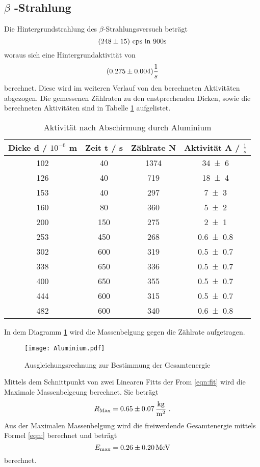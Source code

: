 \subsection{\texorpdfstring{$\beta$ -Strahlung }%
                               {beta -Strahlung}}
Die Hintergrundstrahlung des $\beta$-Strahlungsversuch beträgt 
\begin{equation}
  (\num{248 +- 15}) \text{ cps in } 900 \text{s}
  \label{eqn:hintb}
\end{equation}
woraus sich eine Hintergrundaktivität von 
\begin{equation}
  (\num{0.275 +- 0.004}) \frac{1}{s}
  \label{eqn:HAB}
\end{equation} 
berechnet. Diese wird im weiteren Verlauf von den berechneten Aktivitäten abgezogen. Die gemessenen Zählraten zu den enstprechenden Dicken, sowie die berechneten Aktivitäten sind in Tabelle \ref{tab:AAlu} aufgelistet. 
\begin{table}
  \centering
  \begin{tabular}{c c c c}
    \toprule
    Dicke d / $10^{-6}$ m & Zeit t / s & Zählrate N & Aktivität A / $\frac{1}{s}$ \\
    \midrule
    102&	40 &	1374&	\num{34 +-6 } \\	
    126&	40 &	719&	\num{18 +-4 } \\	
    153&	40 &	297&	\num{7 +-3 } \\	
    160&	80 &	360&	\num{5 +-2 } \\	
    200&	150&	275&	\num{2 +-1 } \\	
    253&	450&	268&	\num{0.6 +-0.8 } \\	
    302&	600&	319&	\num{0.5 +-0.7 } \\	
    338&	650&	336&	\num{0.5 +-0.7 } \\	
    400&	650&	355&	\num{0.5 +-0.7 } \\	
    444&	600&	315&	\num{0.5 +-0.7 } \\	
    482&	600&	340&	\num{0.6 +-0.8 } \\	
    \bottomrule
  \end{tabular}
  \caption{Aktivität nach Abschirmung durch Aluminium}
  \label{tab:AAlu}
\end{table}
In dem Diagramm \ref{fig:Alu} wird die Massenbelgung gegen die Zählrate aufgetragen. 
\begin{figure}
  \centering
  \texttt{[image: Aluminium.pdf]}
  \caption{Ausgleichungsrechnung zur Bestimmung der Gesamtenergie}
  \label{fig:Alu}
\end{figure}
Mittels dem Schnittpunkt von zwei Linearen Fitts der From \eqref{eqn:fit} wird die Maximale Massenbelgeung berechnet. Sie beträgt 
\begin{equation}
  R_\text{Max} = \num{0.65 +- 0.07} \, \frac{\text{kg}}{\text{m}^2} \ . 
  \label{eqn:Rmax}
\end{equation}
Aus der Maximalen Massenbelgung wird die freiwerdende Gesamtenergie mittels Formel \eqref{eqn:} berechnet und beträgt
\begin{equation}
  E_\text{max} = \num{0.26 +- 0.2} \, \text{MeV}
  \label{eqn:max}
\end{equation}
berechnet.
